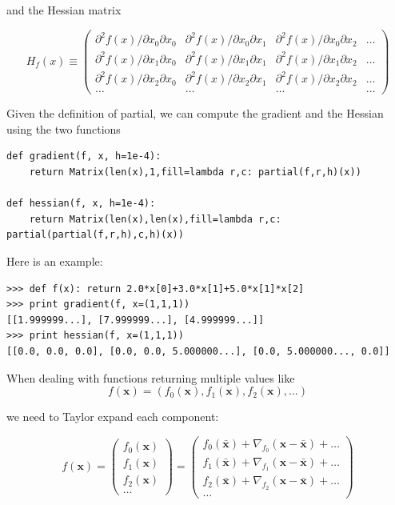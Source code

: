\documentclass[justified,sixbynine]{tufte-book}
\def\ft{\small\tt}
\theoremstyle{plain}%
\theoremstyle{definition}
\theoremstyle{remark}
\begin{document}
\begin{fullwidth}
and the Hessian matrix

\begin{equation}
H_f(x) \equiv 
\begin{pmatrix}
\partial^2 f(x)/\partial x_0\partial x_0 &
\partial^2 f(x)/\partial x_0\partial x_1 &
\partial^2 f(x)/\partial x_0\partial x_2 &
\dots \\
\partial^2 f(x)/\partial x_1\partial x_0 &
\partial^2 f(x)/\partial x_1\partial x_1 &
\partial^2 f(x)/\partial x_1\partial x_2 &
\dots \\
\partial^2 f(x)/\partial x_2\partial x_0 &
\partial^2 f(x)/\partial x_2\partial x_1 &
\partial^2 f(x)/\partial x_2\partial x_2 &
\dots \\
\dots & \dots & \dots &\dots 
\end{pmatrix}
\end{equation}

Given the definition of partial, we can compute the gradient and the Hessian using the two functions

\begin{lstlisting}[caption={in file: {\ft nlib.py}}]
def gradient(f, x, h=1e-4):
    return Matrix(len(x),1,fill=lambda r,c: partial(f,r,h)(x))

def hessian(f, x, h=1e-4):
    return Matrix(len(x),len(x),fill=lambda r,c: partial(partial(f,r,h),c,h)(x))
\end{lstlisting}

Here is an example:

\begin{lstlisting}[caption={in file: {\ft nlib.py}}]
>>> def f(x): return 2.0*x[0]+3.0*x[1]+5.0*x[1]*x[2]
>>> print gradient(f, x=(1,1,1))
[[1.999999...], [7.999999...], [4.999999...]]
>>> print hessian(f, x=(1,1,1))
[[0.0, 0.0, 0.0], [0.0, 0.0, 5.000000...], [0.0, 5.000000..., 0.0]]
\end{lstlisting}

When dealing with functions returning multiple values like
\begin{equation}
f(\mathbf{x}) = (f_0(\mathbf{x}), f_1(\mathbf{x}), f_2(\mathbf{x}), \dots)
\end{equation}

we need to Taylor expand each component:

\begin{equation}
f(\mathbf{x}) =
\begin{pmatrix}
f_0(\mathbf{x}) \\
f_1(\mathbf{x}) \\
f_2(\mathbf{x}) \\
\dots
\end{pmatrix}
 =
\begin{pmatrix}
f_0(\mathbf{\bar x}) + \nabla_{f_0}(\mathbf{x}-\mathbf{\bar x}) + \dots \\
f_1(\mathbf{\bar x}) + \nabla_{f_1}(\mathbf{x}-\mathbf{\bar x}) + \dots \\
f_2(\mathbf{\bar x}) + \nabla_{f_2}(\mathbf{x}-\mathbf{\bar x}) + \dots \\
\dots
\end{pmatrix}
\end{equation}


\end{fullwidth}
\end{document}
